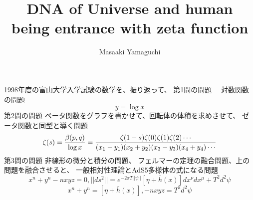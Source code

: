 \documentclass{jsarticle}
\begin{document}
\title{DNA of Universe and human  \\
being entrance with zeta function}
\author{Masaaki Yamaguchi}
\date{}
\maketitle
   \newcommand{\variint}{%
	\begin{picture}(15,30)
		\put(0,0){
			$ \iint $}
		\put(0,5){\line(15,0){15}}
	\end{picture} %
}

\newcommand{\variiint}{%
	\begin{picture}(15,15)
		\put(0,0){
			$ \iiint $}
		\put(0,5){\line(15,0){20}}
	\end{picture} %
}



 \newcommand{\alearletter}{%
	 \begin{picture}(10,20)
		 \put(0,0){
			 $ \square $}
		 \put(0,0){\line(1,1){10}}
	 \end{picture} %
	 }

 \newcommand{\secproduct}{%
	 \begin{picture}(10,20)
		 \put(0,0){
			 $ \nabla $}
		 \put(5,0){+}
	 \end{picture} %
	 }
 \newcommand{\talot}{%
	 \begin{picture}(15,20)
		 \put(0,0){
			 $ \text{\scalebox{2.0}[2]{$\nabla$}}$}
		 \put(5,3){
			 $ \Delta $}
	 \end{picture} %
	 }
 \newcommand{\hazerdnabla}{%
	 \begin{picture}(15,20)
		 \put(0,0){
			 $ \text{\scalebox{2.0}[2]{$\nabla$}}$}
		 \put(5,3){
			 $\text{Y}  $}
	 \end{picture} %
	 }

1998年度の富山大学入学試験の数学を、振り返って、
         第1問の問題　
	 対数関数の問題
         $$ y = \log x $$
	 第2問の問題
	 ベータ関数をグラフを書かせて、回転体の体積を求めさせて、
	 ゼータ関数と同型と導く問題
	 $$ \zeta(s) = {\beta(p,q) \over {\log x}} = 
	 {{\zeta(1-s)\zeta(0)\zeta(1)\zeta(2)\cdots } \over {(x_{1} - y_{1}) 
	 (x_{2} + y_{2})(x_{3} - y_{3})(x_{4} + y_{4})\cdots }} $$
	 第3問の問題
	 非線形の微分と積分の問題、
	 フェルマーの定理の融合問題、上の問題を融合させると、
	 一般相対性理論とAdS5多様体の式になる問題
	 $$ x^{n} + y^{n} -n xyz = 0, ||ds^2|| = e^{-2\pi T||\psi||}
	 [\eta + \bar{h}(x)]dx^{\nu}dx^{\mu} + T^2d^2 \psi $$
	 $$ x^n + y^n = [\eta + \bar{h}(x)],  -n xyz = T^2d^2 \psi $$
\end{document}
